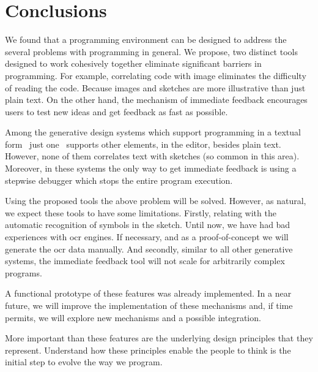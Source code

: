 
% 
% 

\section{Conclusions}
\label{sec:fin}

We found that a programming environment can be designed to address the several problems with programming in general. We propose, two distinct tools designed to work cohesively together eliminate significant barriers in programming. For example, correlating code with image eliminates the difficulty of reading the code. Because images and sketches are more illustrative than just plain text. On the other hand, the mechanism of immediate feedback encourages users to test new ideas and get feedback as fast as possible.

Among the generative design systems which support programming in a textual form~\cite{aish2012designscript,lopes2011portable} just one~\cite{lopes2011portable} supports other elements, in the editor, besides plain text. However, none of them correlates text with sketches (so common in this area). Moreover, in these systems the only way to get immediate feedback is using a stepwise debugger which stops the entire program execution.

Using the proposed tools the above problem will be solved. However, as natural, we expect these tools to have some limitations. Firstly, relating with the automatic recognition of symbols in the sketch. Until now, we have had bad experiences with \ac{ocr} engines. If necessary, and as a proof-of-concept we will generate the \ac{ocr} data manually. And secondly, similar to all other generative systems, the immediate feedback tool will not scale for arbitrarily complex programs.

A functional prototype of these features was already implemented. In a near future, we will improve the implementation of these mechanisms and, if time permits, we will explore new mechanisms and a possible integration.

More important than these features are the underlying design principles that they represent. Understand how these principles enable the people to think is the initial step to evolve the way we program.